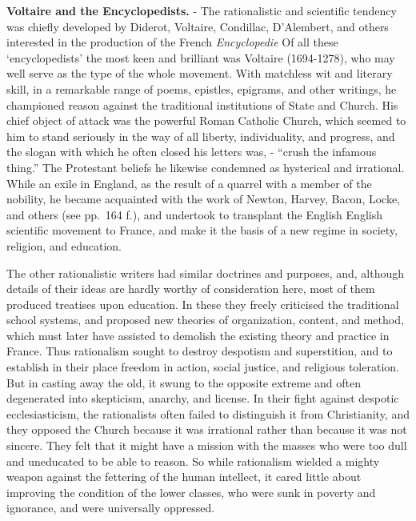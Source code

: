 \documentclass[
]{book}
\begin{document}
\textbf{Voltaire and the Encyclopedists.} - The rationalistic and scientific tendency was chiefly developed by Diderot, Voltaire, Condillac, D'Alembert, and others interested in the production of the French \emph{Encyclopedie} Of all these `encyclopedists' the most keen and brilliant was Voltaire (1694-1278), who may well serve as the type of the whole movement. With matchless wit and literary skill, in a remarkable range of poems, epistles, epigrams, and other writings, he championed reason against the traditional institutions of State and Church. His chief object of attack was the powerful Roman Catholic Church, which seemed to him to stand seriously in the way of all liberty, individuality, and progress, and the slogan with which he often closed his letters was, - ``crush the infamous thing.'' The Protestant beliefs he likewise condemned as hysterical and irrational. While an exile in England, as the result of a quarrel with a member of the nobility, he became acquainted with the work of Newton, Harvey, Bacon, Locke, and others (see pp.~164 f.), and undertook to transplant the English English scientific movement to France, and make it the basis of a new regime in society, religion, and education.

The other rationalistic writers had similar doctrines and purposes, and, although details of their ideas are hardly worthy of consideration here, most of them produced treatises upon education. In these they freely criticised the traditional school systems, and proposed new theories of organization, content, and method, which must later have assisted to demolish the existing theory and practice in France. Thus rationalism sought to destroy despotism and superstition, and to establish in their place freedom in action, social justice, and religious toleration. But in casting away the old, it swung to the opposite extreme and often degenerated into skepticism, anarchy, and license. In their fight against despotic ecclesiasticism, the rationalists often failed to distinguish it from Christianity, and they opposed the Church because it was irrational rather than because it was not sincere. They felt that it might have a mission with the masses who were too dull and uneducated to be able to reason. So while rationalism wielded a mighty weapon against the fettering of the human intellect, it cared little about improving the condition of the lower classes, who were sunk in poverty and ignorance, and were universally oppressed.
\end{document}
